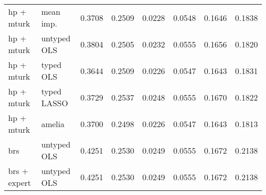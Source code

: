 \begin{table}[ht]
\begin{tabular}{l|l|rrr|rrr}
hp + mturk & mean imp. & 0.3708 & 0.2509 & 0.0228 & 0.0548 & 0.1646 & 0.1838\\
hp + mturk & untyped OLS & 0.3804 & 0.2505 & 0.0232 & 0.0555 & 0.1656 & 0.1820\\
hp + mturk & typed OLS & 0.3644 & 0.2509 & 0.0226 & 0.0547 & 0.1643 & 0.1831\\
hp + mturk & typed LASSO & 0.3729 & 0.2537 & 0.0248 & 0.0555 & 0.1670 & 0.1822\\
hp + mturk & amelia & 0.3700 & 0.2498 & 0.0226 & 0.0547 & 0.1643 & 0.1813\\
brs & untyped OLS & 0.4251 & 0.2530 & 0.0249 & 0.0555 & 0.1672 & 0.2138\\
brs + expert & untyped OLS & 0.4251 & 0.2530 & 0.0249 & 0.0555 & 0.1672 & 0.2138\\
\bottomrule
\end{tabular}
\end{table}
